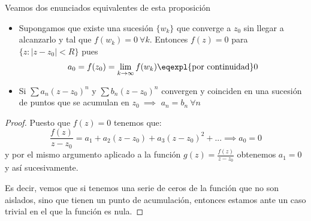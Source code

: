 \documentclass{apuntes}
\begin{document}
\begin{prop}
Veamos dos enunciados equivalentes de esta proposición
\begin{itemize}
\item Supongamos que existe una sucesión $\{w_k\}$ que converge a $z_0$ sin llegar a alcanzarlo y tal que $f(w_k)=0 \ \forall k$. Entonces $f(z)=0$ para $\{z: |z-z_0|<R\}$ pues
\[a_0=f(z_0)=\lim_{k \to \infty} f(w_k) \eqexpl{\text{por continuidad}} 0 \]
\item Si $\sum a_n(z-z_0)^n$ y $\sum b_n(z-z_0)^n$ convergen y coinciden en una sucesión de puntos que se acumulan en $z_0 \ \implies$ $a_n=b_n \ \forall n$
\end{itemize}
\end{prop}
\begin{proof}
Puesto que $f(z)=0$ tenemos que:
\[\frac{f(z)}{z-z_0}=a_1+a_2(z-z_0)+a_3(z-z_0)^2+... \implies a_0=0\]
y por el mismo argumento aplicado a la función $g(z)=\frac{f(z)}{z-z_0}$ obtenemos $a_1=0$ y así sucesivamente.

Es decir, vemos que si tenemos una serie de ceros de la función que no son aislados, sino que tienen un punto de acumulación, entonces estamos ante un caso trivial en el que la función es nula.
\end{proof}
\end{document}
